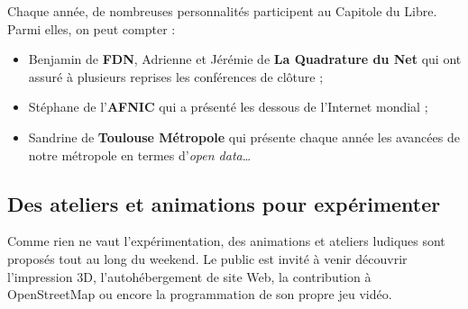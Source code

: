 Chaque année, de nombreuses personnalités participent au Capitole du Libre. Parmi elles, on peut compter :

\begin{itemize}[label=$\bullet$]
\item Benjamin  de \textbf{FDN}, Adrienne  et Jérémie  de \textbf{La Quadrature du Net} qui ont assuré à plusieurs reprises les conférences de clôture ;
\item Stéphane  de l'\textbf{AFNIC} qui a présenté les dessous de l'Internet mondial ;
\item Sandrine  de \textbf{Toulouse Métropole} qui présente chaque année les avancées de notre métropole en termes d'\textit{open data}\dots
\end{itemize} 

\subsection{Des ateliers et animations pour expérimenter}

\begin{minipage}{0.6\textwidth}

Comme rien ne vaut l'expérimentation, des animations et ateliers ludiques sont proposés tout au long du weekend. Le public est invité à venir découvrir l’impression 3D, l’autohébergement de site Web, la contribution à OpenStreetMap ou encore la programmation de son propre jeu vidéo.

\end{minipage}
\begin{minipage}{0.4\textwidth}
\begin{center}
\end{center}
\end{minipage}

